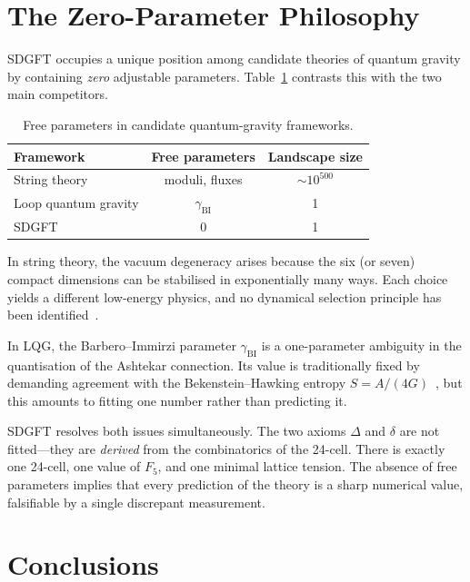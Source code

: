\documentclass[amsmath,amssymb,aps,prd,twocolumn,superscriptaddress,nofootinbib]{revtex4-2}
\begin{document}
\section{The Zero-Parameter Philosophy}\label{sec:zero}

SDGFT occupies a unique position among candidate theories of quantum gravity by
containing \emph{zero} adjustable parameters.  Table~\ref{tab:compare}
contrasts this with the two main competitors.

\begin{table}[H]
\centering
\caption{Free parameters in candidate quantum-gravity
         frameworks.}\label{tab:compare}
\begin{tabular}{@{}lcc@{}}
\toprule
Framework & Free parameters & Landscape size \\
\midrule
String theory & moduli, fluxes & $\sim10^{500}$ \\
Loop quantum gravity & $\gamma_{\text{BI}}$ & 1 \\
SDGFT & 0 & 1 \\
\bottomrule
\end{tabular}
\end{table}

In string theory, the vacuum degeneracy arises because the six (or seven)
compact dimensions can be stabilised in exponentially many ways.  Each choice
yields a different low-energy physics, and no dynamical selection principle has
been identified~\cite{Bousso2000,Susskind2003}.

In LQG, the Barbero--Immirzi parameter $\gamma_{\text{BI}}$ is a one-parameter
ambiguity in the quantisation of the Ashtekar connection.  Its value is
traditionally fixed by demanding agreement with the Bekenstein--Hawking entropy
$S = A/(4G)$~\cite{Immirzi1997,Rovelli1996}, but this amounts to fitting one
number rather than predicting it.

SDGFT resolves both issues simultaneously.  The two axioms $\Delta$ and
$\delta$ are not fitted---they are \emph{derived} from the combinatorics of the
24-cell.  There is exactly one 24-cell, one value of $F_5$, and one minimal
lattice tension.  The absence of free parameters implies that every prediction
of the theory is a sharp numerical value, falsifiable by a single discrepant
measurement.

\section{Conclusions}\label{sec:conclusions}
\end{document}
